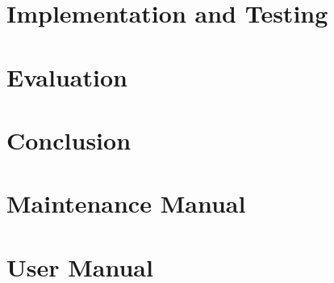 \documentclass{csfourzero}
\begin{document}
\newpage
\section{Implementation and Testing}
\label{sec:implementation}



\newpage
\section{Evaluation}
\label{sec:evaluation}



\newpage
\section{Conclusion}
\label{sec:conclusion}


\newpage
\printbibliography


\appendix

\clearpage
{}
\section{Maintenance Manual}


\newpage
{}
\section{User Manual}

\end{document}
